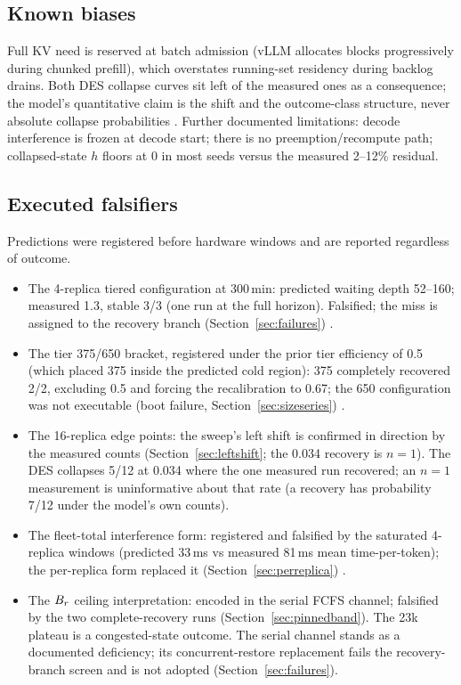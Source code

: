 \subsection{Known biases}
\label{sec:biases}

Full KV need is reserved at batch admission (vLLM allocates blocks
progressively during chunked prefill), which overstates running-set
residency during backlog drains. Both DES collapse curves sit left
of the measured ones as a consequence; the model's quantitative
claim is the shift and the outcome-class structure, never absolute
collapse probabilities . Further documented limitations: decode
interference is frozen at decode start; there is no
preemption/recompute path; collapsed-state $h$ floors at 0 in most
seeds versus the measured 2--12\% residual.

\subsection{Executed falsifiers}
\label{sec:falsifiers}

Predictions were registered before hardware windows and are reported
regardless of outcome.

\begin{itemize}
\item The 4-replica tiered configuration at 300\,min: predicted waiting
  depth 52--160; measured 1.3, stable 3/3 (one run at the full
  horizon). Falsified; the miss is assigned to the recovery branch
  (Section~\ref{sec:failures}) .
\item The tier 375/650 bracket, registered under the prior tier
  efficiency of 0.5 (which placed 375 inside the predicted cold
  region): 375 completely recovered 2/2, excluding 0.5 and forcing
  the recalibration to 0.67; the 650 configuration was not
  executable (boot failure, Section~\ref{sec:sizeseries}) .
\item The 16-replica edge points: the sweep's left shift is confirmed in
  direction by the measured counts (Section~\ref{sec:leftshift}; the 0.034 recovery
  is $n=1$). The DES collapses 5/12 at 0.034 where the one measured
  run recovered; an $n=1$ measurement is uninformative about that rate
  (a recovery has probability 7/12 under the model's own counts).
\item The fleet-total interference form: registered and falsified by the
  saturated 4-replica windows (predicted 33\,ms vs measured 81\,ms
  mean time-per-token); the per-replica form replaced it
  (Section~\ref{sec:perreplica}) .
\item The $B_r$ ceiling interpretation: encoded in the serial FCFS
  channel; falsified by the two complete-recovery runs
  (Section~\ref{sec:pinnedband}). The 23k plateau is a congested-state outcome. The
  serial channel stands as a documented deficiency; its
  concurrent-restore replacement fails the recovery-branch screen
  and is not adopted (Section~\ref{sec:failures}).
\end{itemize}

